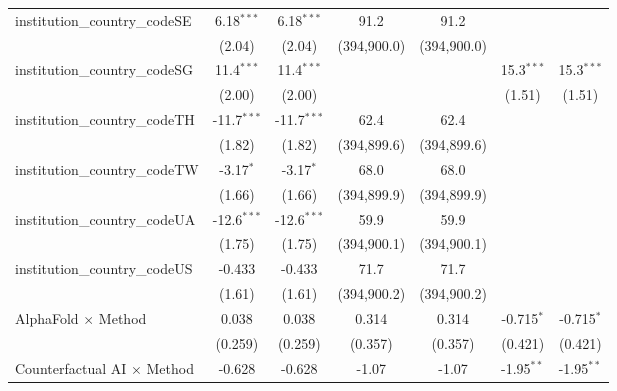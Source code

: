 \begin{tabular}{lcccccc}
   institution\_country\_codeSE          & 6.18$^{***}$  & 6.18$^{***}$  & 91.2          & 91.2          &               &   \\   
                                         & (2.04)        & (2.04)        & (394,900.0)   & (394,900.0)   &               &   \\   
   institution\_country\_codeSG          & 11.4$^{***}$  & 11.4$^{***}$  &               &               & 15.3$^{***}$  & 15.3$^{***}$\\   
                                         & (2.00)        & (2.00)        &               &               & (1.51)        & (1.51)\\   
   institution\_country\_codeTH          & -11.7$^{***}$ & -11.7$^{***}$ & 62.4          & 62.4          &               &   \\   
                                         & (1.82)        & (1.82)        & (394,899.6)   & (394,899.6)   &               &   \\   
   institution\_country\_codeTW          & -3.17$^{*}$   & -3.17$^{*}$   & 68.0          & 68.0          &               &   \\   
                                         & (1.66)        & (1.66)        & (394,899.9)   & (394,899.9)   &               &   \\   
   institution\_country\_codeUA          & -12.6$^{***}$ & -12.6$^{***}$ & 59.9          & 59.9          &               &   \\   
                                         & (1.75)        & (1.75)        & (394,900.1)   & (394,900.1)   &               &   \\   
   institution\_country\_codeUS          & -0.433        & -0.433        & 71.7          & 71.7          &               &   \\   
                                         & (1.61)        & (1.61)        & (394,900.2)   & (394,900.2)   &               &   \\   
   AlphaFold $\times$ Method             & 0.038         & 0.038         & 0.314         & 0.314         & -0.715$^{*}$  & -0.715$^{*}$\\   
                                         & (0.259)       & (0.259)       & (0.357)       & (0.357)       & (0.421)       & (0.421)\\   
   Counterfactual AI $\times$ Method     & -0.628        & -0.628        & -1.07         & -1.07         & -1.95$^{**}$  & -1.95$^{**}$\\   

\end{tabular}
